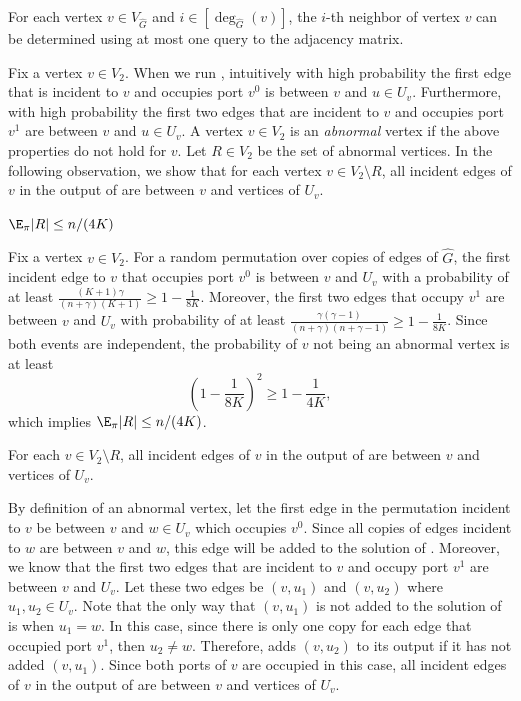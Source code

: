 \begin{observation}\label{obs: finding-neighbor}
For each vertex $v \in V_{\hat{G}}$ and $i \in [\deg_{\hat{G}}(v)]$, the $i$-th neighbor of vertex $v$ can be determined using at most one query to the adjacency matrix.
\end{observation}


Fix a vertex $v \in V_2$. When we run \algtwo{}, intuitively with high probability the first edge that is incident to $v$ and occupies port $v^0$ is between $v$ and $u \in U_v$. Furthermore, with high probability the first two edges that are incident to $v$ and occupies port $v^1$ are between $v$ and $u \in U_v$. A vertex $v \in V_2$ is an {\em abnormal} vertex if the above properties do not hold for $v$. Let $R \in V_2$ be the set of abnormal vertices. In the following observation, we show that for each vertex $v \in V_2 \setminus R$, all incident edges of $v$ in the output of \algtwo{} are between $v$ and vertices of $U_v$.


\begin{claim}\label{clm:abnormal-vertices-count}
$\E_\pi|R| \leq n/(4K)$
\end{claim}
\begin{myproof}
Fix a vertex $v \in V_2$. For a random permutation over copies of edges of $\hat{G}$, the first incident edge to $v$ that occupies port $v^0$ is between $v$ and $U_v$ with a probability of at least $\frac{(K + 1)\gamma}{(n + \gamma)(K+1)} \geq 1 - \frac{1}{8K}$. Moreover, the first two edges that occupy $v^1$ are between $v$ and $U_v$ with probability of at least $\frac{\gamma(\gamma - 1)}{(n+\gamma)(n+\gamma - 1)} \geq 1 - \frac{1}{8K}$. Since both events are independent, the probability of $v$ not being an abnormal vertex is at least
$$
\left(1 - \frac{1}{8K}\right)^2 \geq 1 - \frac{1}{4K}
,$$
which implies $\E_\pi|R| \leq n/(4K)$.
\end{myproof}


\begin{claim}\label{obs: good-vertices}
For each $v \in V_2 \setminus R$, all incident edges of $v$ in the output of \algtwo{} are between $v$ and vertices of $U_v$.
\end{claim}

\begin{myproof}
By definition of an abnormal vertex, let the first edge in the permutation incident to $v$ be between $v$ and $w \in U_v$ which occupies $v^0$. Since all copies of edges incident to $w$ are between $v$ and $w$, this edge will be added to the solution of \algtwo{}. Moreover, we know that the first two edges that are incident to $v$ and occupy port $v^1$ are between $v$ and $U_v$. Let these two edges be $(v, u_1)$ and $(v, u_2)$ where $u_1, u_2 \in U_v$. Note that the only way that $(v, u_1)$ is not added to the solution of \algtwo{} is when $u_1 = w$. In this case, since there is only one copy for each edge that occupied port $v^1$, then $u_2 \neq w$. Therefore, \algtwo{} adds $(v, u_2)$ to its output if it has not added $(v, u_1)$. Since both ports of $v$ are occupied in this case, all incident edges of $v$ in the output of \algtwo{} are between $v$ and vertices of $U_v$. 
\end{myproof}


